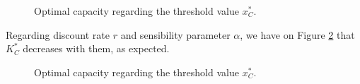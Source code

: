 \begin{figure}[!htb]
	\begin{subfigmatrix}{2}
	\end{subfigmatrix}
	\caption{Optimal capacity regarding the threshold value $x^*_C$.}
	\label{fig:k1}
\end{figure}

Regarding discount rate $r$ and sensibility parameter $\alpha$, we have on Figure \ref{fig:k2} that $K^*_C$ decreases with them, as expected.
 
\begin{figure}[!htb]
	\begin{subfigmatrix}{2}
	\end{subfigmatrix}
	\caption{Optimal capacity regarding the threshold value $x^*_C$.}
	\label{fig:k2}
\end{figure}









